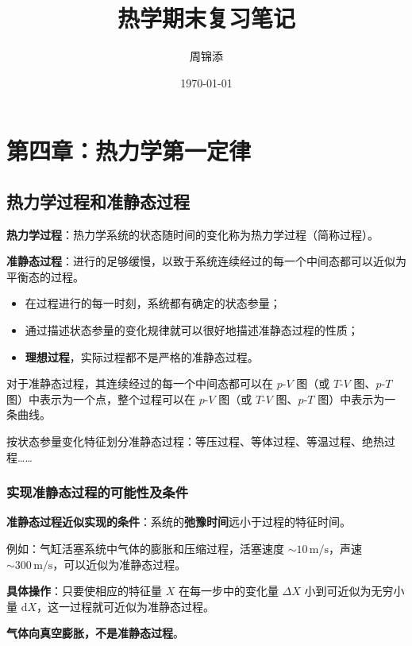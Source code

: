 \documentclass[UTF8]{ctexart}
\title{\textbf{热学期末复习笔记}}
\author{周锦添}
\date{\today}
\theoremstyle{definition}
\begin{document}
\maketitle
\tableofcontents
\newpage

\section{第四章：热力学第一定律}

\subsection{热力学过程和准静态过程}

\textbf{热力学过程}：热力学系统的状态随时间的变化称为热力学过程（简称过程）。

\textbf{准静态过程}：进行的足够缓慢，以致于系统连续经过的每一个中间态都可以近似为平衡态的过程。
\begin{itemize}
    \item 在过程进行的每一时刻，系统都有确定的状态参量；
    \item 通过描述状态参量的变化规律就可以很好地描述准静态过程的性质；
    \item \textbf{理想过程}，实际过程都不是严格的准静态过程。
\end{itemize}

对于准静态过程，其连续经过的每一个中间态都可以在 $p$-$V$ 图（或 $T$-$V$ 图、$p$-$T$ 图）中表示为一个点，整个过程可以在 $p$-$V$ 图（或 $T$-$V$ 图、$p$-$T$ 图）中表示为一条曲线。

按状态参量变化特征划分准静态过程：等压过程、等体过程、等温过程、绝热过程……

\subsubsection*{实现准静态过程的可能性及条件}

\textbf{准静态过程近似实现的条件}：系统的\textbf{弛豫时间}远小于过程的特征时间。

例如：气缸活塞系统中气体的膨胀和压缩过程，活塞速度 $\sim 10\,\mathrm{m/s}$，声速 $\sim 300\,\mathrm{m/s}$，可以近似为准静态过程。

\textbf{具体操作}：只要使相应的特征量 $X$ 在每一步中的变化量 $\Delta X$ 小到可近似为无穷小量 $\mathrm{d}X$，这一过程就可近似为准静态过程。

\textbf{气体向真空膨胀，不是准静态过程}。
\end{document}
